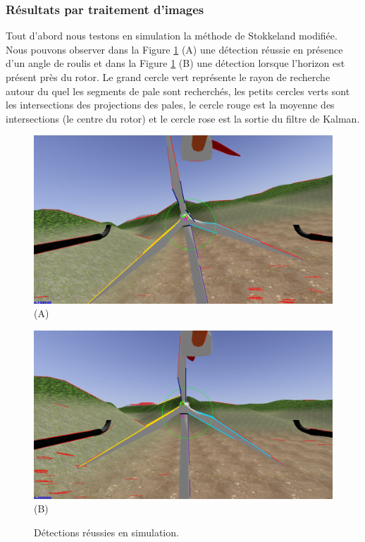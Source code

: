 \subsubsection{Résultats par traitement d'images}

Tout d'abord nous testons en simulation la méthode de Stokkeland modifiée. Nous pouvons observer dans la Figure \ref{fig:sim_detection} (A) une détection réussie en présence d'un angle de roulis et dans la Figure \ref{fig:sim_detection} (B) une détection lorsque l'horizon est présent près du rotor. Le grand cercle vert représente le rayon de recherche autour du quel les segments de pale sont recherchés, les petits cercles verts sont les intersections des projections des pales, le cercle rouge est la moyenne des intersections (le centre du rotor) et le cercle rose est la sortie du filtre de Kalman.
\begin{figure}[htp]
  \centering
  \begin{minipage}{0.49\textwidth}
    \centering
    \includegraphics[width=\linewidth]{images/sim_detection.png} (A)
  \end{minipage}
  \begin{minipage}{0.49\textwidth}
    \centering
    \includegraphics[width=\linewidth]{images/sim_detection3.png} (B)
  \end{minipage}
  \caption{Détections réussies en simulation.}
  \label{fig:sim_detection}
\end{figure}

